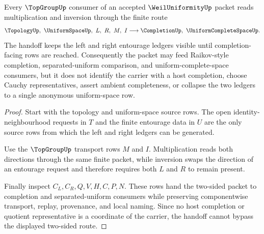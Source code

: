 \begin{theorem}
\label{thm:weil-uniformity-topgroup-handoff}
Every $\TopGroupUp$ consumer of an accepted $\WeilUniformityUp$ packet reads multiplication and inversion through the finite route
$$
\TopologyUp,\ \UniformSpaceUp,\ L,\ R,\ M,\ I \longrightarrow \CompletionUp,\ \UniformCompleteSpaceUp .
$$
The handoff keeps the left and right entourage ledgers visible until completion-facing rows are reached. Consequently the packet may feed Raikov-style completion, separated-uniform comparison, and uniform-complete-space consumers, but it does not identify the carrier with a host completion, choose Cauchy representatives, assert ambient completeness, or collapse the two ledgers to a single anonymous uniform-space row.
\end{theorem}
\begin{proof}
Start with the topology and uniform-space source rows. The open identity-neighbourhood requests in $T$ and the finite entourage data in $U$ are the only source rows from which the left and right ledgers can be generated.

Use the $\TopGroupUp$ transport rows $M$ and $I$. Multiplication reads both directions through the same finite packet, while inversion swaps the direction of an entourage request and therefore requires both $L$ and $R$ to remain present.

Finally inspect $C_L,C_R,Q,V,H,C,P,N$. These rows hand the two-sided packet to completion and separated-uniform consumers while preserving componentwise transport, replay, provenance, and local naming. Since no host completion or quotient representative is a coordinate of the carrier, the handoff cannot bypass the displayed two-sided route.
\end{proof}


\begin{closurestatus}{\WeilUniformityUp}
  \theoryclosure{\seedClosure}
  \formalstatus{\unformalizedV}
\end{closurestatus}
